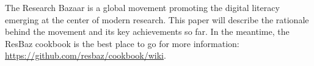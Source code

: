 The Research Bazaar is a global movement promoting the digital literacy emerging at the center of modern research. This paper will describe the rationale behind the movement and its key achievements so far. In the meantime, the ResBaz cookbook is the best place to go for more information: \url{https://github.com/resbaz/cookbook/wiki}.